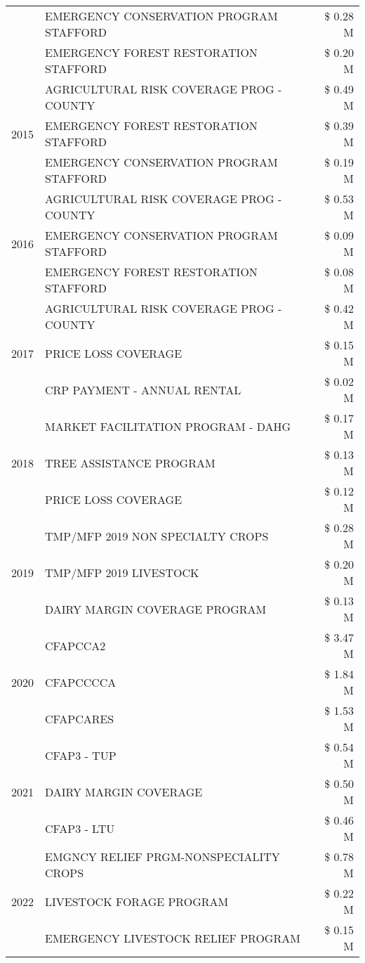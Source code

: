 \begin{tabular}{llr}
 & EMERGENCY CONSERVATION PROGRAM STAFFORD & \$ 0.28 M \\
 & EMERGENCY FOREST RESTORATION STAFFORD & \$ 0.20 M \\
\cline{1-3}
\multirow[t]{3}{*}{2015} & AGRICULTURAL RISK COVERAGE PROG - COUNTY & \$ 0.49 M \\
 & EMERGENCY FOREST RESTORATION STAFFORD & \$ 0.39 M \\
 & EMERGENCY CONSERVATION PROGRAM STAFFORD & \$ 0.19 M \\
\cline{1-3}
\multirow[t]{3}{*}{2016} & AGRICULTURAL RISK COVERAGE PROG - COUNTY & \$ 0.53 M \\
 & EMERGENCY CONSERVATION PROGRAM STAFFORD & \$ 0.09 M \\
 & EMERGENCY FOREST RESTORATION STAFFORD & \$ 0.08 M \\
\cline{1-3}
\multirow[t]{3}{*}{2017} & AGRICULTURAL RISK COVERAGE PROG - COUNTY & \$ 0.42 M \\
 & PRICE LOSS COVERAGE & \$ 0.15 M \\
 & CRP PAYMENT - ANNUAL RENTAL & \$ 0.02 M \\
\cline{1-3}
\multirow[t]{3}{*}{2018} & MARKET FACILITATION PROGRAM - DAHG & \$ 0.17 M \\
 & TREE ASSISTANCE PROGRAM & \$ 0.13 M \\
 & PRICE LOSS COVERAGE & \$ 0.12 M \\
\cline{1-3}
\multirow[t]{3}{*}{2019} & TMP/MFP 2019 NON SPECIALTY CROPS & \$ 0.28 M \\
 & TMP/MFP 2019 LIVESTOCK & \$ 0.20 M \\
 & DAIRY MARGIN COVERAGE PROGRAM & \$ 0.13 M \\
\cline{1-3}
\multirow[t]{3}{*}{2020} & CFAPCCA2 & \$ 3.47 M \\
 & CFAPCCCCA & \$ 1.84 M \\
 & CFAPCARES & \$ 1.53 M \\
\cline{1-3}
\multirow[t]{3}{*}{2021} & CFAP3 - TUP & \$ 0.54 M \\
 & DAIRY MARGIN COVERAGE & \$ 0.50 M \\
 & CFAP3 - LTU & \$ 0.46 M \\
\cline{1-3}
\multirow[t]{3}{*}{2022} & EMGNCY RELIEF PRGM-NONSPECIALITY CROPS & \$ 0.78 M \\
 & LIVESTOCK FORAGE PROGRAM & \$ 0.22 M \\
 & EMERGENCY LIVESTOCK RELIEF PROGRAM & \$ 0.15 M \\
\cline{1-3}
\bottomrule
\end{tabular}
